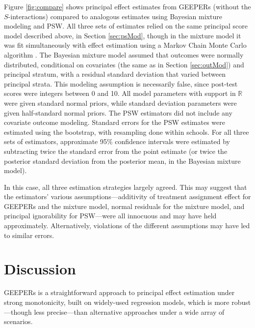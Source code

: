 \documentclass[11pt]{article} %
\begin{document}
Figure \ref{fig:compare} shows principal effect estimates from GEEPERs (without the $S$-interactions) compared to analogous estimates using Bayesian mixture modeling and PSW.
All three sets of estimates relied on the same principal score model described above, in Section \ref{sec:psMod}, though in the mixture model it was fit simultaneously with effect estimation using a Markov Chain Monte Carlo algorithm \citep{rstan}.
The Bayesian mixture model assumed that outcomes were normally distributed, conditional on covariates (the same as in Section \ref{sec:outMod}) and principal stratum, with a residual standard deviation that varied between principal strata. This modeling assumption is necessarily false, since post-test scores were integers between 0 and 10. All model parameters with support in $\mathbb{R}$ were given standard normal priors, while standard deviation parameters were given half-standard normal priors.
The PSW estimators did not include any covariate outcome modeling. Standard errors for the PSW estimates were estimated using the bootstrap, with resampling done within schools.
For all three sets of estimators, approximate 95\% confidence intervals were estimated by subtracting twice the standard error from the point estimate (or twice the posterior standard deviation from the posterior mean, in the Bayesian mixture model).

In this case, all three estimation strategies largely agreed. This may suggest that the estimators' various assumptions---additivity of treatment assignment effect for GEEPERs and the mixture model, normal residuals for the mixture model, and principal ignorability for PSW---were all innocuous and may have held approximately. Alternatively, violations of the different assumptions may have led to similar errors.


\section{Discussion}\label{sec:discussion}
GEEPERs is a straightforward approach to principal effect estimation under strong monotonicity, built on widely-used regression models, which is more robust---though less precise---than alternative approaches under a wide array of scenarios.
\end{document}
